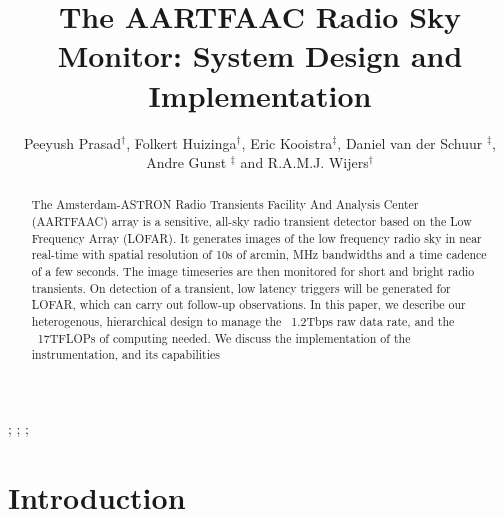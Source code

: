 \documentclass{ws-jai}
\begin{document}
\catchline{}{}{}{}{} %


\title{The AARTFAAC Radio Sky Monitor: System Design and Implementation}

\author{Peeyush Prasad$^\dagger$, Folkert Huizinga$^\dagger$, Eric Kooistra$^\ddagger$, Daniel van der Schuur $^\ddagger$, Andre Gunst $^\ddagger$ and R.A.M.J. Wijers$^\dagger$}

\address{
$^\dagger$Anton Pannekoek Institute, Universitiet van Amsterdam, Amsterdam, The Netherlands, fauthor@university.com\\
$^\ddagger$ASTRON, Oude Hoogeveensedijk, 7991PD, The Netherlands\\
$^\S$Group, Company, Address, City, State ZIP/Zone, Country, fauthor@company.com
}

\maketitle


\begin{history}
;
;
;
\end{history}

\begin{abstract}
The Amsterdam-ASTRON  Radio Transients  Facility And Analysis  Center (AARTFAAC)
array  is  a sensitive,  all-sky  radio  transient  detector  based on  the  Low
Frequency Array (LOFAR).  It generates images  of the low frequency radio sky in
near real-time  with spatial resolution of  10s of arcmin, MHz  bandwidths and a
time cadence of a few seconds. The image timeseries are then monitored for short
and bright radio  transients. On detection of a transient,  low latency triggers
will be  generated for LOFAR,  which can  carry out follow-up  observations.  In
this  paper, we  describe our  heterogenous, hierarchical  design to  manage the
~1.2Tbps raw  data rate, and the  ~17TFLOPs of computing needed.  We discuss the
implementation of the instrumentation, and its capabilities
\end{abstract}


\section{\label{sec:Introduction}Introduction}
\end{document}
